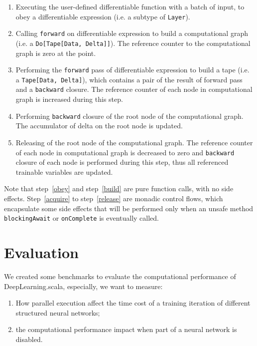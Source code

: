 \begin{enumerate}
  \item Executing the user-defined \gls{differentiable function} with a batch of input, to obey a \gls{differentiable expression} (i.e. a subtype of \lstinline{Layer}).
  \label{obey}
  
  \item Calling \lstinline{forward} on \gls{differentiable expression} to build a \gls{computational graph} (i.e. a \lstinline{Do[Tape[Data, Delta]]}). The reference counter to the \gls{computational graph} is zero at the point.
  \label{build}
  
  \item Performing the \lstinline{forward} pass of \gls{differentiable expression} to build a tape (i.e. a \lstinline{Tape[Data, Delta]}), which contains a pair of the result of forward pass and a \lstinline{backward} closure. The reference counter of each node in \gls{computational graph} is increased during this step.
  \label{acquire}

  \item Performing \lstinline{backward} closure of the root node of the \gls{computational graph}. The accumulator of delta on the root node is updated.

  \item Releasing of the root node of the \gls{computational graph}. The reference counter of each node in \gls{computational graph} is decreased to zero and \lstinline{backward} closure of each node is performed during this step, thus all referenced \glspl{trainable variable} are updated.
  \label{release}

\end{enumerate}

Note that step~\ref{obey} and step~\ref{build} are pure function calls, with no side effects. Step~\ref{acquire} to step~\ref{release} are monadic control flows, which encapsulate some side effects that will be performed only when an unsafe method \lstinline{blockingAwait} or \lstinline{onComplete} is eventually called.

\section{Evaluation}

We created some benchmarks to evaluate the computational performance of DeepLearning.scala, especially, we want to measure:

\begin{enumerate}
  \item How parallel execution affect the time cost of a training iteration of different structured neural networks;
  \item the computational performance impact when part of a neural network is disabled.
\end{enumerate}

